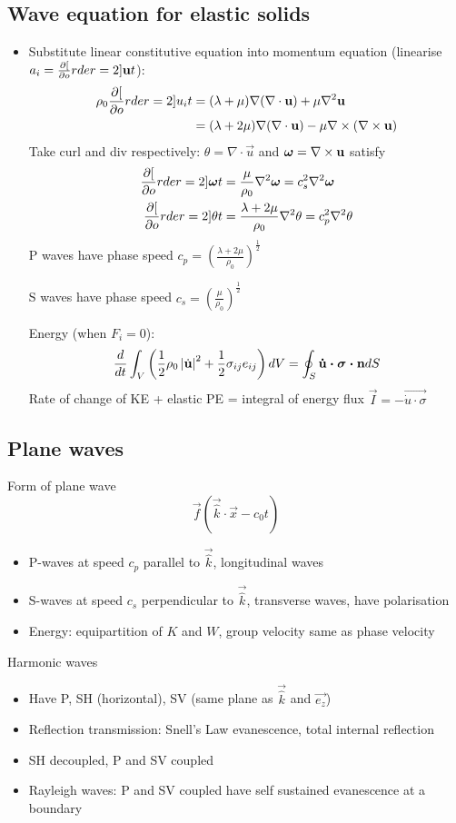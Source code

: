\subsection*{Wave equation for elastic solids}
\begin{itemize}
    \item Substitute linear constitutive equation into momentum equation (linearise $a_i = \frac{\partial{[}}{\partial{o}}rder=2]{\boldsymbol{\mathbf{u}}}{t}$): 
    \begin{align*}
        \rho_0 \frac{\partial{[}}{\partial{o}}rder=2]{u_i}{t} &= (\lambda+\mu) \nabla(\nabla\cdot\boldsymbol{\mathbf{u}}) + \mu \nabla^2 \boldsymbol{\mathbf{u}} \\
        &= (\lambda +2\mu) \nabla(\nabla\cdot\boldsymbol{\mathbf{u}}) -  \mu \mathbf{\nabla} \times  (\mathbf{\nabla} \times \boldsymbol{\mathbf{u}}) 
    \end{align*}
    Take curl and div respectively: $\theta =\nabla\cdot\vec{u}$ and $\boldsymbol{\mathbf{\omega}} =\mathbf{\nabla} \times \boldsymbol{\mathbf{u}}$ satisfy
    \begin{align*}
        \frac{\partial{[}}{\partial{o}}rder=2]{\boldsymbol{\mathbf{\omega}}}{t} &= \frac{\mu}{\rho_0} \nabla^2 \boldsymbol{\mathbf{\omega}}  = c_s^2  \nabla^2 \boldsymbol{\mathbf{\omega}} \\
        \frac{\partial{[}}{\partial{o}}rder=2]{\theta}{t} &= \frac{\lambda+2\mu}{\rho_0} \nabla^2 \theta = c_p^2 \nabla^2 \theta 
    \end{align*}
    P waves have phase speed $c_p = \left(\frac{\lambda+2\mu}{\rho_0} \right)^{\frac{1}{2}}$

    S waves have phase speed $c_s = \left(\frac{\mu}{\rho_0} \right)^{\frac{1}{2}}$

    Energy (when $F_i=0$): 
    \[\frac{d}{dt} \int_V \left(\frac12 \rho_0 \left| \dot{\boldsymbol{\mathbf{u}}} \right|^2  + \frac{1}{2} \sigma_{ij} e_{ij} \right) dV =  \oint_S \boldsymbol{\mathbf{\dot{u} \cdot \sigma \cdot n }}  dS  \]
    Rate of change of KE + elastic PE = integral of energy flux $\vec{I} =  - \vec{\dot{u} \cdot \sigma}$
\end{itemize}
\subsection*{Plane waves}
Form of plane wave \[\vec{f}(\vec{\hat{k}} \cdot \vec{x} -c_0 t)\]
\begin{itemize}
    \item P-waves at speed $c_p$ parallel to $\vec{\hat{k}}$, longitudinal waves 
    \item S-waves at speed $c_s$ perpendicular to $\vec{\hat{k}}$, transverse waves, have polarisation
    \item Energy: equipartition of $K$ and $W$, group velocity same as phase velocity
\end{itemize}
Harmonic waves
\begin{itemize}
    \item Have P, SH (horizontal), SV (same plane as $\vec{\hat{k}}$ and $\vec{e_z}$)
    \item Reflection transmission: Snell's Law evanescence, total internal reflection 
    \item SH decoupled, P and SV coupled
    \item Rayleigh waves: P and SV coupled have self sustained evanescence at a boundary
\end{itemize}
